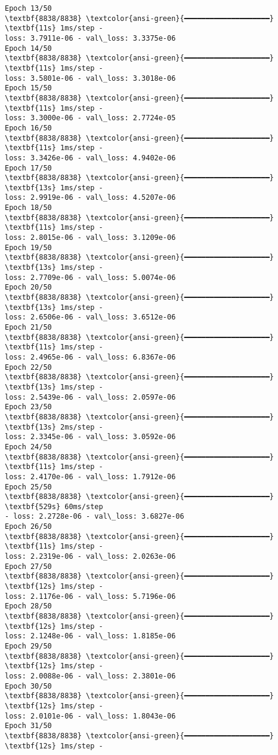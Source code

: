 \documentclass[11pt]{article}
\begin{document}
\begin{Verbatim}[commandchars=\\\{\}]
Epoch 13/50
\textbf{8838/8838} \textcolor{ansi-green}{━━━━━━━━━━━━━━━━━━━━} \textbf{11s} 1ms/step -
loss: 3.7911e-06 - val\_loss: 3.3375e-06
Epoch 14/50
\textbf{8838/8838} \textcolor{ansi-green}{━━━━━━━━━━━━━━━━━━━━} \textbf{11s} 1ms/step -
loss: 3.5801e-06 - val\_loss: 3.3018e-06
Epoch 15/50
\textbf{8838/8838} \textcolor{ansi-green}{━━━━━━━━━━━━━━━━━━━━} \textbf{11s} 1ms/step -
loss: 3.3000e-06 - val\_loss: 2.7724e-05
Epoch 16/50
\textbf{8838/8838} \textcolor{ansi-green}{━━━━━━━━━━━━━━━━━━━━} \textbf{11s} 1ms/step -
loss: 3.3426e-06 - val\_loss: 4.9402e-06
Epoch 17/50
\textbf{8838/8838} \textcolor{ansi-green}{━━━━━━━━━━━━━━━━━━━━} \textbf{13s} 1ms/step -
loss: 2.9919e-06 - val\_loss: 4.5207e-06
Epoch 18/50
\textbf{8838/8838} \textcolor{ansi-green}{━━━━━━━━━━━━━━━━━━━━} \textbf{11s} 1ms/step -
loss: 2.8015e-06 - val\_loss: 3.1209e-06
Epoch 19/50
\textbf{8838/8838} \textcolor{ansi-green}{━━━━━━━━━━━━━━━━━━━━} \textbf{13s} 1ms/step -
loss: 2.7709e-06 - val\_loss: 5.0074e-06
Epoch 20/50
\textbf{8838/8838} \textcolor{ansi-green}{━━━━━━━━━━━━━━━━━━━━} \textbf{13s} 1ms/step -
loss: 2.6506e-06 - val\_loss: 3.6512e-06
Epoch 21/50
\textbf{8838/8838} \textcolor{ansi-green}{━━━━━━━━━━━━━━━━━━━━} \textbf{11s} 1ms/step -
loss: 2.4965e-06 - val\_loss: 6.8367e-06
Epoch 22/50
\textbf{8838/8838} \textcolor{ansi-green}{━━━━━━━━━━━━━━━━━━━━} \textbf{13s} 1ms/step -
loss: 2.5439e-06 - val\_loss: 2.0597e-06
Epoch 23/50
\textbf{8838/8838} \textcolor{ansi-green}{━━━━━━━━━━━━━━━━━━━━} \textbf{13s} 2ms/step -
loss: 2.3345e-06 - val\_loss: 3.0592e-06
Epoch 24/50
\textbf{8838/8838} \textcolor{ansi-green}{━━━━━━━━━━━━━━━━━━━━} \textbf{11s} 1ms/step -
loss: 2.4170e-06 - val\_loss: 1.7912e-06
Epoch 25/50
\textbf{8838/8838} \textcolor{ansi-green}{━━━━━━━━━━━━━━━━━━━━} \textbf{529s} 60ms/step
- loss: 2.2728e-06 - val\_loss: 3.6827e-06
Epoch 26/50
\textbf{8838/8838} \textcolor{ansi-green}{━━━━━━━━━━━━━━━━━━━━} \textbf{11s} 1ms/step -
loss: 2.2319e-06 - val\_loss: 2.0263e-06
Epoch 27/50
\textbf{8838/8838} \textcolor{ansi-green}{━━━━━━━━━━━━━━━━━━━━} \textbf{12s} 1ms/step -
loss: 2.1176e-06 - val\_loss: 5.7196e-06
Epoch 28/50
\textbf{8838/8838} \textcolor{ansi-green}{━━━━━━━━━━━━━━━━━━━━} \textbf{12s} 1ms/step -
loss: 2.1248e-06 - val\_loss: 1.8185e-06
Epoch 29/50
\textbf{8838/8838} \textcolor{ansi-green}{━━━━━━━━━━━━━━━━━━━━} \textbf{12s} 1ms/step -
loss: 2.0088e-06 - val\_loss: 2.3801e-06
Epoch 30/50
\textbf{8838/8838} \textcolor{ansi-green}{━━━━━━━━━━━━━━━━━━━━} \textbf{12s} 1ms/step -
loss: 2.0101e-06 - val\_loss: 1.8043e-06
Epoch 31/50
\textbf{8838/8838} \textcolor{ansi-green}{━━━━━━━━━━━━━━━━━━━━} \textbf{12s} 1ms/step -

\end{Verbatim}
\end{document}
